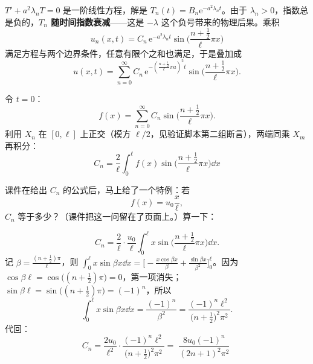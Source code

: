$T'+a^2\lambda_nT=0$ 是一阶线性方程，解是 $T_n(t)=B_n\mathrm e^{-a^2\lambda_n t}$。由于 $\lambda_n>0$，指数总是负的，\textbf{$T_n$ 随时间指数衰减}——这是 $-\lambda$ 这个负号带来的物理后果。乘积
\begin{equation}
  u_n(x,t)=C_n\,\mathrm e^{-a^2\lambda_n t}\sin\Big(\frac{n+\frac12}{\ell}\pi x\Big)
\end{equation}
满足方程与两个边界条件，任意有限个之和也满足，于是叠加成
\begin{equation}
  u(x,t)=\sum_{n=0}^{\infty}C_n\,\mathrm e^{-\left(\frac{n+\frac12}{\ell}\pi a\right)^2t}
  \sin\Big(\frac{n+\frac12}{\ell}\pi x\Big).
\end{equation}

令 $t=0$：
\begin{equation}
  f(x)=\sum_{n=0}^{\infty}C_n\sin\Big(\frac{n+\frac12}{\ell}\pi x\Big).
\end{equation}
利用 $X_n$ 在 $[0,\ell]$ 上正交（模方 $\ell/2$，见验证脚本第二组断言），两端同乘 $X_m$ 再积分：
\begin{equation}
  \boxed{\;C_n=\frac{2}{\ell}\int_0^{\ell}f(x)\sin\Big(\frac{n+\frac12}{\ell}\pi x\Big)\dd x\;}
\end{equation}

\label{sec:c-n}

课件在给出 $C_n$ 的公式后，马上给了一个特例：若
\begin{equation}
  f(x)=u_0\frac{x}{\ell},
\end{equation}
$C_n$ 等于多少？（课件把这一问留在了页面上。）算一下：

\begin{equation}
  C_n=\frac{2}{\ell}\cdot\frac{u_0}{\ell}\int_0^{\ell}x\sin\Big(\frac{n+\frac12}{\ell}\pi x\Big)\dd x .
\end{equation}
记 $\beta=\frac{(n+\frac12)\pi}{\ell}$，则 $\int_0^{\ell}x\sin\beta x\dd x=\Big[-\frac{x\cos\beta x}{\beta}+\frac{\sin\beta x}{\beta^2}\Big]_0^{\ell}$。因为 $\cos\beta\ell=\cos\big((n+\frac12)\pi\big)=0$，第一项消失；$\sin\beta\ell=\sin\big((n+\frac12)\pi\big)=(-1)^n$，所以
\begin{equation}
  \int_0^{\ell}x\sin\beta x\dd x=\frac{(-1)^n}{\beta^2}=\frac{(-1)^n\ell^2}{\big(n+\frac12\big)^2\pi^2}.
\end{equation}
代回：
\begin{equation}
  C_n=\frac{2u_0}{\ell^2}\cdot\frac{(-1)^n\ell^2}{\big(n+\frac12\big)^2\pi^2}
  =\boxed{\;\frac{8u_0(-1)^n}{(2n+1)^2\pi^2}\;}
\end{equation}

